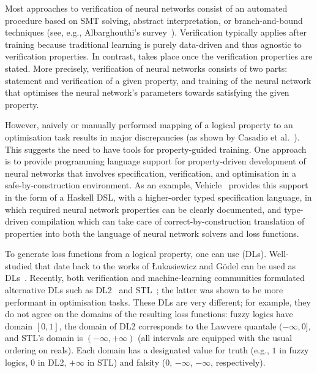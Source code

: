 \documentclass[a4paper,UKenglish,cleveref, autoref, thm-restate]{lipics-v2021}
\def\DLtwo{\textrm{DL2}}
\def\STL{\textrm{STL}}
\begin{document}
Most approaches to verification of neural networks consist of an
automated procedure based on SMT solving, abstract interpretation, or
branch-and-bound techniques (see, e.g., Albarghouthi's
survey~\cite{albarghouthi-book}).
%
Verification typically applies after training because traditional
learning is purely data-driven and thus agnostic to verification
properties.
%
In contrast,  takes place once the
verification properties are stated.
%
More precisely, verification of neural networks consists of two parts:
statement and verification of a given property, and training
of the neural network that optimises the neural network's parameters
towards satisfying the given property.

However, naively or manually performed mapping of a logical property
to an optimisation task results in major discrepancies (as shown by
Casadio et al.~\cite{CasadioKDKKAR22}). This suggests the need to have
tools for property-guided training. One approach is to provide
programming language support for property-driven development of neural
networks that involves specification, verification, and optimisation in
a safe-by-construction environment.
As an example, Vehicle~\cite{FoMLAS2023,daggitt2024vehicle} provides this 
support in the form of
a Haskell DSL, with a higher-order typed specification
language, in which required neural network properties can be clearly
documented, and type-driven compilation which can take care of
correct-by-construction translation of properties into both the
language of neural network solvers and loss functions.

To generate loss functions from a logical property, one can use
 (DLs).
%
Well-studied  that date back to the works of
Łukasiewicz and G\"{o}del can be used as DLs~\cite{van2022analyzing}.
Recently, both verification and machine-learning communities
formulated alternative DLs such as \DLtwo~\cite{fischer2019dl2} and
\STL~\cite{varnai}; the latter was shown to 
be more performant in
optimisation tasks. These DLs are very different; for example, they do
not agree on the domains of the resulting loss functions: fuzzy logics
have domain $[0,1]$,
%
the domain of \DLtwo{} corresponds to the Lawvere quantale
$(- \infty, 0]$, and
%
\STL{}'s domain is $(-\infty, +\infty)$ (all intervals are equipped with
the usual ordering on reals).  Each domain has a designated value for
truth (e.g., $1$ in fuzzy logics, $0$ in \DLtwo{}, $+\infty$ in \STL)
and falsity ($0$, $-\infty$, $-\infty$, respectively).
\end{document}
